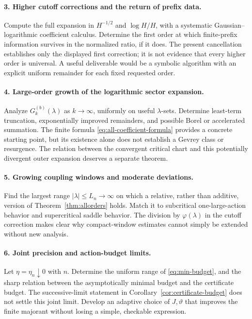 \documentclass[11pt,a4paper]{article}
\numberwithin{equation}{section}
\theoremstyle{definition}
\theoremstyle{remark}
\newcommand{\ph}{\varphi}
\begin{document}
\paragraph{3. Higher cutoff corrections and the return of prefix data.}
Compute the full expansion in \(H^{-1/2}\) and \(\log H/H\), with a
systematic Gaussian--logarithmic coefficient calculus. Determine the first
order at which finite-prefix information survives in the normalized ratio,
if it does. The present cancellation establishes only the displayed first
correction; it is not evidence that every higher order is universal.
A useful deliverable would be a symbolic algorithm with an explicit
uniform remainder for each fixed requested order.

\paragraph{4. Large-order growth of the logarithmic sector expansion.}
Analyze \(G_k^{(b)}(\lambda)\) as \(k\to\infty\), uniformly on useful
\(\lambda\)-sets. Determine least-term truncation, exponentially improved
remainders, and possible Borel or accelerated summation. The finite formula
\eqref{eq:all-coefficient-formula} provides a concrete starting point, but
its existence alone does not establish a Gevrey class or resurgence.
The relation between the convergent critical chart and this potentially
divergent outer expansion deserves a separate theorem.

\paragraph{5. Growing coupling windows and moderate deviations.}
Find the largest range \(|\lambda|\le L_n\to\infty\) on which a relative,
rather than additive, version of Theorem~\ref{thm:allorders} holds. Match it
to subcritical one-large-action behavior and supercritical saddle behavior.
The division by \(\ph(\lambda)\) in the cutoff correction makes clear why
compact-window estimates cannot simply be extended without new analysis.

\paragraph{6. Joint precision and action-budget limits.}
Let \(\eta=\eta_n\downarrow0\) with \(n\). Determine the uniform range of
\eqref{eq:min-budget}, and the sharp relation between the asymptotically
minimal budget and the certificate budget. The successive-limit statement
in Corollary~\ref{cor:certificate-budget} does not settle this joint limit.
Develop an adaptive choice of \(J,\vartheta\) that improves the finite
majorant without losing a simple, checkable expression.
\end{document}
